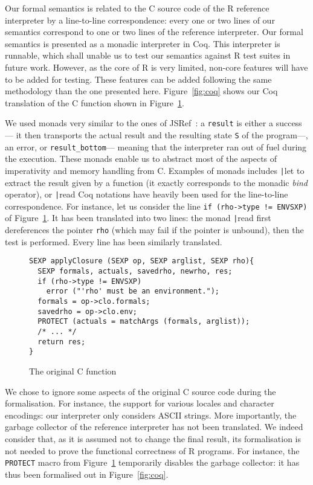 \documentclass[9pt, sigplan, natbib=false, screen=true]{acmart}
\newcommand\Coq{Coq}
\newcommand\R{R}
\newcommand\Cn{C}
\begin{document}
Our formal semantics is related to the \Cn{} source code
of the \R{} reference interpreter
by a line-to-line correspondence:
every one or two lines of our semantics
correspond to one or two lines of the reference interpreter.
Our formal semantics is presented as a monadic interpreter in \Coq{}.
This interpreter is runnable,
which shall unable us to test our semantics against
\R{} test suites in future work.
However, as the core of \R{} is very limited,
non-core features will have to be added for testing.
These features can be added following the same methodology than the one presented here.
Figure~\ref{fig:coq} shows our \Coq{} translation
of the \Cn{} function shown in Figure~\ref{fig:c}.

We used monads very similar to the ones of JSRef~\parencite{popl14jscert}:
a \texttt{result} is either a success---%
it then transports the actual result and the resulting state
\texttt{S} of the program---,
an error, or \texttt{result_bottom}---%
meaning that the interpreter ran out of fuel during the execution.
These monads enable us to abstract most of the aspects
of imperativity and memory handling from \Cn{}.
Examples of monads includes
\texttt|let%
to extract the result given by a function
(it exactly corresponds to the monadic \emph{bind} operator),
or \texttt|read%
\Coq{} notations have heavily been used
for the line-to-line correspondence.
For instance, let us consider
the line \texttt{if (rho->type != ENVSXP)}
of Figure~\ref{fig:c}.
It has been translated into two lines:
the monad \texttt|read%
first dereferences the pointer \texttt{rho}
(which may fail if the pointer is unbound),
then the test is performed.
Every line has been similarly translated.

\begin{figure}
\begin{verbatim}
SEXP applyClosure (SEXP op, SEXP arglist, SEXP rho){
  SEXP formals, actuals, savedrho, newrho, res;
  if (rho->type != ENVSXP)
    error ("'rho' must be an environment.");
  formals = op->clo.formals;
  savedrho = op->clo.env;
  PROTECT (actuals = matchArgs (formals, arglist));
  /* ... */
  return res;
}
\end{verbatim}
    \caption{The original \Cn{} function}
    \label{fig:c}
\end{figure}

We chose to ignore some aspects of the original \Cn{} source code
during the formalisation.
For instance, the support for various locales and character encodings:
our interpreter only considers ASCII strings.
More importantly, the garbage collector of the reference interpreter
has not been translated.
We indeed consider that, as it is assumed not to change the final result,
its formalisation is not needed to prove the functional correctness
of \R{} programs.
For instance,
the \texttt{PROTECT} macro from Figure~\ref{fig:c}
temporarily disables the garbage collector:
it has thus been formalised out in Figure~\ref{fig:coq}.
\end{document}

